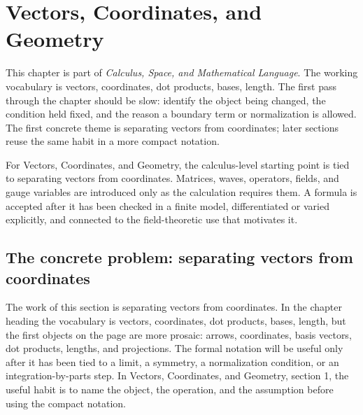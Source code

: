 \chapter{Vectors, Coordinates, and Geometry}


This chapter is part of \emph{Calculus, Space, and Mathematical Language}.  The working vocabulary is vectors, coordinates, dot products, bases, length.  The first pass through the chapter should be slow: identify the object being changed, the condition held fixed, and the reason a boundary term or normalization is allowed.  The first concrete theme is separating vectors from coordinates; later sections reuse the same habit in a more compact notation.

For Vectors, Coordinates, and Geometry, the calculus-level starting point is tied to separating vectors from coordinates.  Matrices, waves, operators, fields, and gauge variables are introduced only as the calculation requires them.  A formula is accepted after it has been checked in a finite model, differentiated or varied explicitly, and connected to the field-theoretic use that motivates it.

\section{The concrete problem: separating vectors from coordinates}













The work of this section is separating vectors from coordinates.  In the chapter heading the vocabulary is vectors, coordinates, dot products, bases, length, but the first objects on the page are more prosaic: arrows, coordinates, basis vectors, dot products, lengths, and projections.  The formal notation will be useful only after it has been tied to a limit, a symmetry, a normalization condition, or an integration-by-parts step.  In Vectors, Coordinates, and Geometry, section 1, the useful habit is to name the object, the operation, and the assumption before using the compact notation.


